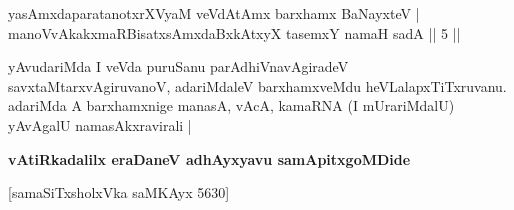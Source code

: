 \begin{shl}\footnotemark[1]yasAmxdaparatanotxrXV\s yaM veVdAtAmx barxhamx BaNayxteV |\\
manoVvAkakxmaRBisatxsAmxdaBxkAtxyX tasemxY namaH sadA \hfill || 5 ||
\end{shl}

\begin{artha}
yAvudariMda I veVda puruSanu parAdhiVnavAgiradeV
savxtaMtarxvAgiruvanoV, adariMdaleV barxhamxveMdu
heVLalapxTiTxruvanu. adariMda A barxhamxnige manasA, vAcA, kamaRNA
(I mUrariMdalU) yAvAgalU namasAkxravirali |
\end{artha}

\begin{center}
\textbf{vAtiRkadalilx eraDaneV adhAyxyavu samApitxgoMDide }

\medskip

 [samaSiTxsholxVka saMKAyx 5630]
\end{center}
